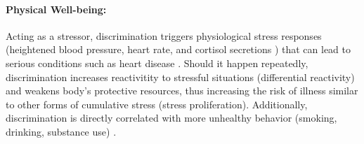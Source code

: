 \paragraph{Physical Well-being:}
\label{sec:back-discrimination-physical}
Acting as a stressor, discrimination triggers physiological stress responses %
(\eg heightened blood pressure, heart rate, and cortisol secretions \cite{Brondolo:2008, Steffen:2003, Smart:2010}) that can lead to serious conditions such as heart disease \cite{Marshall:1997, Cohen:1994}. Should it happen repeatedly, discrimination increases reactivitity to stressful situations \cite{GuyllMatthewsBrom-berger:2001} (differential reactivity) and weakens body's protective resources, thus increasing the risk of illness similar to other forms of cumulative stress \cite{GeeSpencerChenTakeuchi:2007} (stress proliferation). %
Additionally, discrimination is directly correlated with more unhealthy behavior (\eg smoking, drinking, substance use) \cite{LandrineKlonoff:1996, MartinTuchRoman:2003}. %


